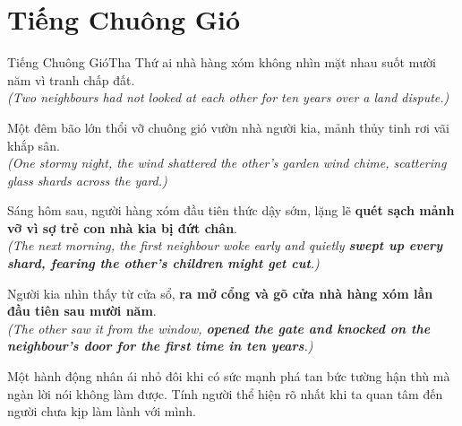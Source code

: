 \section{Tiếng Chuông Gió}
\begin{truyen}{Tiếng Chuông Gió}{Tha Thứ}
ai nhà hàng xóm không nhìn mặt nhau suốt mười năm vì tranh chấp đất.\\
\textit{(Two neighbours had not looked at each other for ten years over a land dispute.)}

Một đêm bão lớn thổi vỡ chuông gió vườn nhà người kia, mảnh thủy tinh rơi vãi khắp sân.\\
\textit{(One stormy night, the wind shattered the other's garden wind chime, scattering glass shards across the yard.)}

Sáng hôm sau, người hàng xóm đầu tiên thức dậy sớm, lặng lẽ \textbf{quét sạch mảnh vỡ vì sợ trẻ con nhà kia bị đứt chân}.\\
\textit{(The next morning, the first neighbour woke early and quietly \textbf{swept up every shard, fearing the other's children might get cut}.)}

Người kia nhìn thấy từ cửa sổ, \textbf{ra mở cổng và gõ cửa nhà hàng xóm lần đầu tiên sau mười năm}.\\
\textit{(The other saw it from the window, \textbf{opened the gate and knocked on the neighbour's door for the first time in ten years}.)}
\end{truyen}
\begin{baihoc}
  Một hành động nhân ái nhỏ đôi khi có sức mạnh phá tan bức tường hận thù mà ngàn lời nói không làm được. Tính người thể hiện rõ nhất khi ta quan tâm đến người chưa kịp làm lành với mình.
\end{baihoc}

